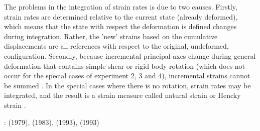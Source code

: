The problems in the integration of strain rates is due to two causes. Firstly, strain rates are determined relative to the current state (already deformed), which means that the state with respect the deformation is defined changes during integration. Rather, the 'new' strains based on the cumulative  displacements are all references with respect to the original, undeformed, configuration. Secondly, because incremental principal axes change during general deformation that contains simple shear or rigid body rotation (which does not occur for the special cases of experiment 2, 3 and 4), incremental strains cannot be summed \cite{malvern}. In the special cases where there is no rotation, strain rates may be integrated, and the result is a strain measure called natural strain or Hencky strain \cite{malvern}.


\Literature: \textcite{mcke79} (1979), \textcite{mcja83} (1983), \textcite{foti93} (1993), \textcite{tifo93} (1993) 


